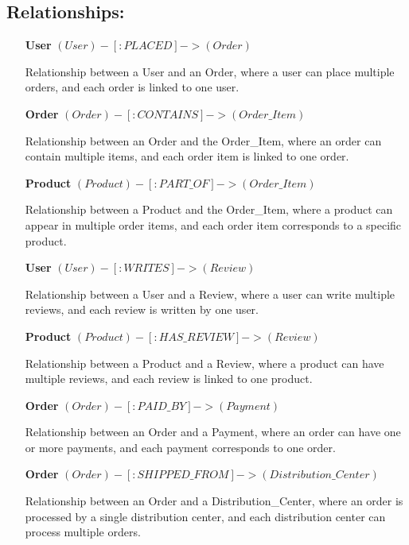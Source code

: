 \documentclass[a4paper,12pt]{article}
\begin{document}
    \subsection{Relationships:}
    \begin{itemize}[noitemsep]
      
        \item[\textbf{User}] $(User)-[:PLACED]->(Order)$
        
        Relationship between a User and an Order, where a user can place multiple orders, and each order is linked to one user.
        
        \item[\textbf{Order}] $(Order)-[:CONTAINS]->(Order\_Item)$
        
        Relationship between an Order and the Order\_Item, where an order can contain multiple items, and each order item is linked to one order.
        
        \item[\textbf{Product}] $(Product)-[:PART\_OF]->(Order\_Item)$
        
        Relationship between a Product and the Order\_Item, where a product can appear in multiple order items, and each order item corresponds to a specific product.
        
        \item[\textbf{User}] $(User)-[:WRITES]->(Review)$
        
        Relationship between a User and a Review, where a user can write multiple reviews, and each review is written by one user.
        
        \item[\textbf{Product}] $(Product)-[:HAS\_REVIEW]->(Review)$
        
        Relationship between a Product and a Review, where a product can have multiple reviews, and each review is linked to one product.
        
        \item[\textbf{Order}] $(Order)-[:PAID\_BY]->(Payment)$
        
        Relationship between an Order and a Payment, where an order can have one or more payments, and each payment corresponds to one order.
        
        \item[\textbf{Order}] $(Order)-[:SHIPPED\_FROM]->(Distribution\_Center)$
        
        Relationship between an Order and a Distribution\_Center, where an order is processed by a single distribution center, and each distribution center can process multiple orders.
        

\end{itemize}
\end{document}
